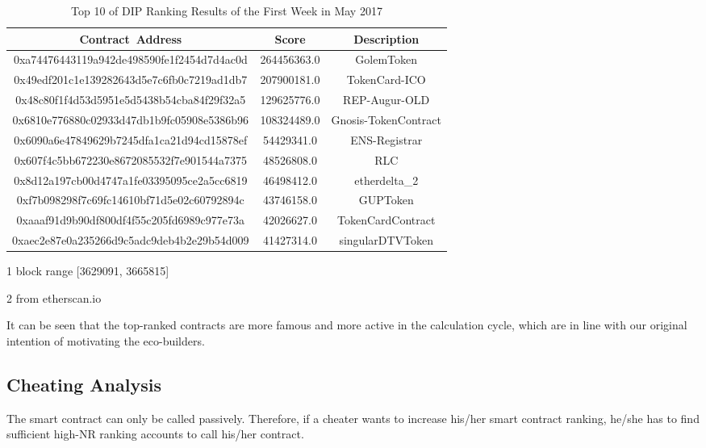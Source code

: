 \begin{table}[h]
\centering
\begin{threeparttable}[b]
\caption{Top 10 of DIP Ranking Results of the First Week in May 2017}
\label{table:dip}
\begin{tabular}{ccc} \toprule
    {Contract~Address} & {Score} & {Description\tnote{2}} \\ \midrule
0xa74476443119a942de498590fe1f2454d7d4ac0d & 264456363.0 & GolemToken \\
0x49edf201c1e139282643d5e7c6fb0c7219ad1db7 & 207900181.0 & TokenCard-ICO \\
0x48c80f1f4d53d5951e5d5438b54cba84f29f32a5 & 129625776.0 & REP-Augur-OLD \\
0x6810e776880c02933d47db1b9fc05908e5386b96 & 108324489.0 & Gnosis-TokenContract \\
0x6090a6e47849629b7245dfa1ca21d94cd15878ef & 54429341.0 & ENS-Registrar \\
0x607f4c5bb672230e8672085532f7e901544a7375 & 48526808.0 & RLC \\
0x8d12a197cb00d4747a1fe03395095ce2a5cc6819 & 46498412.0 & etherdelta\_2 \\
0xf7b098298f7c69fc14610bf71d5e02c60792894c & 43746158.0 & GUPToken \\
0xaaaf91d9b90df800df4f55c205fd6989c977e73a & 42026627.0 & TokenCardContract \\
0xaec2e87e0a235266d9c5adc9deb4b2e29b54d009 & 41427314.0 & singularDTVToken \\
\bottomrule
\end{tabular}
\begin{tablenotes}
  \small
  \item[1] block range [3629091, 3665815]
  \item[2] from etherscan.io
\end{tablenotes}
\end{threeparttable}
\end{table}

It can be seen that the top-ranked contracts are more famous and more active in the calculation cycle, which are in line with our original intention of motivating the eco-builders.

\subsection{Cheating Analysis}
\label{dip:sybil}

The smart contract can only be called passively. Therefore, if a cheater wants to increase his/her smart contract ranking, he/she has to find sufficient high-NR ranking accounts to call his/her contract.

